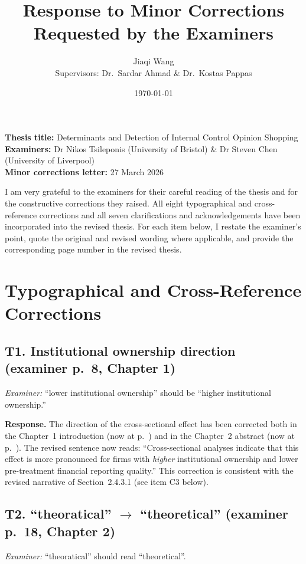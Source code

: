 \documentclass[11pt,a4paper]{article}
\title{Response to Minor Corrections Requested by the Examiners}
\author{Jiaqi Wang\\[2pt]\normalsize Supervisors: Dr.\ Sardar Ahmad \& Dr.\ Kostas Pappas}
\date{\today}
\newcommand{\thesistitle}{Determinants and Detection of Internal Control Opinion Shopping}
\newcommand{\nowat}[1]{(now at p.~\pageref{#1})}
\begin{document}
\maketitle

\noindent\textbf{Thesis title:} \thesistitle\\
\noindent\textbf{Examiners:} Dr Nikos Tsileponis (University of Bristol) \& Dr Steven Chen (University of Liverpool)\\
\noindent\textbf{Minor corrections letter:} 27 March 2026

\vspace{1em}

I am very grateful to the examiners for their careful reading of the thesis and for the constructive corrections they raised. All eight typographical and cross-reference corrections and all seven clarifications and acknowledgements have been incorporated into the revised thesis. For each item below, I restate the examiner's point, quote the original and revised wording where applicable, and provide the corresponding page number in the revised thesis.

\section{Typographical and Cross-Reference Corrections}

\subsection*{T1. Institutional ownership direction (examiner p.~8, Chapter 1)}
\textit{Examiner:} ``lower institutional ownership'' should be ``higher institutional ownership.''

\noindent\textbf{Response.} The direction of the cross-sectional effect has been corrected both in the Chapter~1 introduction \nowat{viva:c1-io} and in the Chapter~2 abstract \nowat{viva:c2-abstract-io}. The revised sentence now reads: ``Cross-sectional analyses indicate that this effect is more pronounced for firms with \emph{higher} institutional ownership and lower pre-treatment financial reporting quality.'' This correction is consistent with the revised narrative of Section~2.4.3.1 (see item C3 below).

\subsection*{T2. ``theoratical'' $\rightarrow$ ``theoretical'' (examiner p.~18, Chapter 2)}
\textit{Examiner:} ``theoratical'' should read ``theoretical''.
\end{document}
